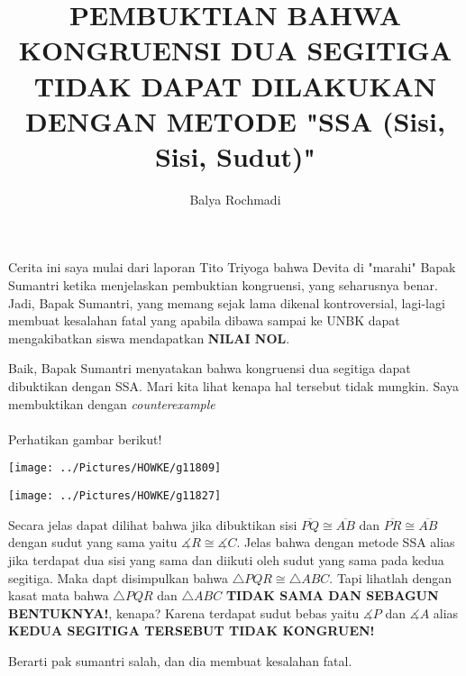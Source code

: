 \documentclass[12pt,a4paper]{article}
\author{Balya Rochmadi}
\title{PEMBUKTIAN BAHWA KONGRUENSI DUA SEGITIGA TIDAK DAPAT DILAKUKAN DENGAN METODE "SSA (Sisi, Sisi, Sudut)"}
\begin{document}
	\maketitle
	\paragraph*{}
	Cerita ini saya mulai dari laporan Tito Triyoga bahwa Devita di "marahi" Bapak Sumantri ketika menjelaskan pembuktian kongruensi, yang seharusnya benar. Jadi, Bapak Sumantri, yang memang sejak lama dikenal kontroversial, lagi-lagi membuat kesalahan fatal yang apabila dibawa sampai ke UNBK dapat mengakibatkan siswa mendapatkan \textbf{NILAI NOL}.
	
	Baik, Bapak Sumantri menyatakan bahwa kongruensi dua segitiga dapat dibuktikan dengan SSA. Mari kita lihat kenapa hal tersebut tidak mungkin. Saya membuktikan dengan \textit{counterexample}
	
	\paragraph*{}
		Perhatikan gambar berikut!
	\begin{center}
	\texttt{[image: ../Pictures/HOWKE/g11809]}
	\end{center}

	\begin{center}
	\texttt{[image: ../Pictures/HOWKE/g11827]}
	\end{center}
	
	Secara jelas dapat dilihat bahwa jika dibuktikan sisi $\overline{PQ} \cong \overline{AB}$ dan $\overline{PR} \cong \overline{AB}$ dengan sudut yang sama yaitu $\measuredangle R \cong \measuredangle C$. Jelas bahwa dengan metode SSA alias jika terdapat dua sisi yang sama dan diikuti oleh sudut yang sama pada kedua segitiga. Maka dapt disimpulkan bahwa $\triangle PQR \cong \triangle ABC$. Tapi lihatlah dengan kasat mata bahwa $\triangle PQR$ dan $\triangle ABC$ \textbf{TIDAK SAMA DAN SEBAGUN BENTUKNYA!}, kenapa? Karena terdapat sudut bebas yaitu $\measuredangle P$ dan $\measuredangle A $ alias\textbf{ KEDUA SEGITIGA TERSEBUT TIDAK KONGRUEN!}
	
	Berarti pak sumantri salah, dan dia membuat kesalahan fatal.
	
	
	
	
	
\end{document}
